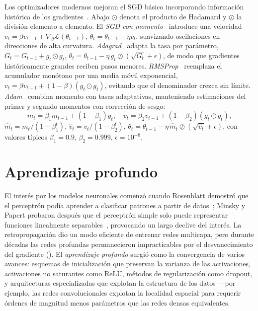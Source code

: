 Los optimizadores modernos mejoran el SGD b\'asico incorporando informaci\'on
hist\'orica de los gradientes~\citep{kingma2014adam,duchi2011adagrad}. Abajo
$\odot$ denota el producto de Hadamard y $\oslash$ la divisi\'on elemento a
elemento. El \emph{SGD con momento}~\citep{polyak1964methods} introduce una
velocidad $v_t = \beta v_{t-1} + \nabla_\theta\mathcal{L}(\theta_{t-1})$,
$\theta_t = \theta_{t-1} - \eta v_t$, suavizando oscilaciones en direcciones de
alta curvatura. \emph{Adagrad}~\citep{duchi2011adagrad} adapta la tasa por
par\'ametro, $G_t = G_{t-1} + g_t \odot g_t$, $\theta_t = \theta_{t-1} - \eta\,
g_t \oslash (\sqrt{G_t} + \epsilon)$, de modo que gradientes hist\'oricamente
grandes reciben pasos menores. \emph{RMSProp}~\citep{hinton2012rmsprop} reemplaza
el acumulador mon\'otono por una media m\'ovil exponencial, $v_t = \beta v_{t-1} +
(1-\beta)(g_t \odot g_t)$, evitando que el denominador crezca sin l\'imite.
\emph{Adam}~\citep{kingma2014adam} combina momento con tasas adaptativas,
manteniendo estimaciones del primer y segundo momentos con correcci\'on de sesgo:
\[
  m_t = \beta_1 m_{t-1} + (1-\beta_1)g_t, \quad
  v_t = \beta_2 v_{t-1} + (1-\beta_2)(g_t \odot g_t),
\]
$\hat m_t = m_t/(1-\beta_1^t)$, $\hat v_t = v_t/(1-\beta_2^t)$, $\theta_t =
\theta_{t-1} - \eta\, \hat m_t \oslash (\sqrt{\hat v_t} + \epsilon)$, con valores
t\'ipicos $\beta_1 = 0.9$, $\beta_2 = 0.999$, $\epsilon = 10^{-8}$.

\section{Aprendizaje profundo}
\label{sec:found:deep}

El inter\'es por los modelos neuronales comenz\'o cuando Rosenblatt demostr\'o que
el perceptr\'on pod\'ia aprender a clasificar patrones a partir de
datos~\citep{rosenblatt1958perceptron}; Minsky y Papert probaron despu\'es que el
perceptr\'on simple solo puede representar funciones linealmente
separables~\citep{minsky1969perceptrons}, provocando un largo declive del inter\'es.
La retropropagaci\'on dio un modo eficiente de entrenar redes multicapa, pero
durante d\'ecadas las redes profundas permanecieron impracticables por el
desvanecimiento del gradiente (). El \emph{aprendizaje
profundo} surgi\'o como la convergencia de varios avances: esquemas de
inicializaci\'on que preservan la varianza de las activaciones, activaciones no
saturantes como ReLU, m\'etodos de regularizaci\'on como dropout, y arquitecturas
especializadas que explotan la estructura de los datos ---por ejemplo, las redes
convolucionales explotan la localidad espacial para requerir \'ordenes de magnitud
menos par\'ametros que las redes densas equivalentes.

